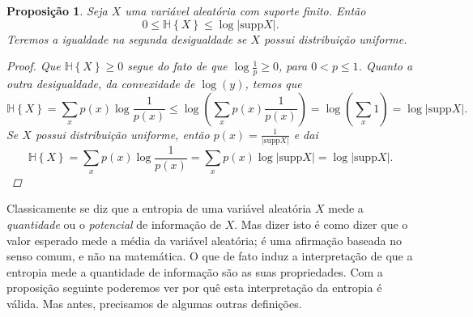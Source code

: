 \documentclass{amsart}
\theoremstyle{theorem}
\newtheorem{proposicao}{Proposi\c{c}\~{a}o}[section]
\theoremstyle{definition}
\theoremstyle{remark}
\numberwithin{equation}{section}
\newcommand{\HH}[1]{\mathbb{H}\left\{ #1 \right\}}
\newcommand{\supp}[1]{\mathrm{supp} #1}
\begin{document}
\begin{proposicao}
  Seja $X$ uma vari\'{a}vel aleat\'{o}ria com suporte finito. Ent\~{a}o
  \begin{equation*}
    0 \leq \HH{X} \leq \log{|\supp{X}|}.
  \end{equation*}
  Teremos a igualdade na segunda desigualdade se $X$ possui distribui\c{c}\~{a}o uniforme.

  \begin{proof}
    Que $\HH{X} \geq 0$ segue do fato de que $\log \frac{1}{p} \geq 0$, para $0<p\leq 1$. Quanto a outra desigualdade, da convexidade de $\log(y)$, temos que
    \begin{equation*}
      \HH{X} = \sum_{x} p(x) \log \frac{1}{p(x)}  \leq \log{ \left( \sum_{x} p(x) \frac{1}{p(x)}\right) } = \log\left( \sum_{x} 1\right) =\log|\supp{X}|.
    \end{equation*}
    Se $X$ possui distribui\c{c}\~{a}o uniforme, ent\~{a}o $p(x) = \frac{1}{|\supp{X}|}$ e dai
    \begin{equation*}
      \HH{X} = \sum_{x} p(x) \log \frac{1}{p(x)}  = \sum_{x} p(x) \log |\supp{X}| = \log{|\supp{X}|}.
    \end{equation*}
%
%
      \end{proof}
\end{proposicao}

Classicamente se diz que a entropia de uma vari\'{a}vel aleat\'{o}ria $X$ mede a \emph{quantidade} ou o \emph{potencial} de informa\c{c}\~{a}o de $X$. Mas dizer isto \'{e} como dizer que o valor esperado mede a m\'{e}dia da vari\'{a}vel aleat\'{o}ria; \'{e} uma afirma\c{c}\~{a}o baseada no senso comum, e n\~{a}o na matem\'{a}tica. O que de fato induz a interpreta\c{c}\~{a}o de que a entropia mede a quantidade de informa\c{c}\~{a}o s\~{a}o as suas propriedades. Com a proposi\c{c}\~{a}o seguinte poderemos ver por qu\^{e} esta interpreta\c{c}\~{a}o da entropia \'{e} v\'{a}lida. Mas antes, precisamos de algumas outras defini\c{c}\~{o}es.
\end{document}
